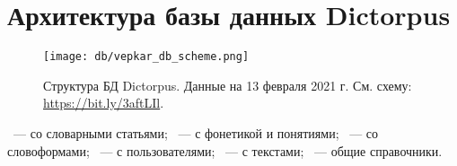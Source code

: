 ﻿\section{Архитектура базы данных Dictorpus} \label{sect_arch_db}

\begin{landscape}

\begin{figure}
    \centering
    \texttt{[image: db/vepkar\_db\_scheme.png]}
   \caption{Структура БД Dictorpus. Данные на 13 февраля 2021 г.  См. схему: \url{https://bit.ly/3aftLIl}.} 
   \label{fig:vepkar_db_scheme}
\end{figure}

~--- со словарными статьями;
~--- с фонетикой и понятиями;
~--- со словоформами;
~--- с пользователями;
~--- с текстами;
~--- общие справочники.
\end{landscape}